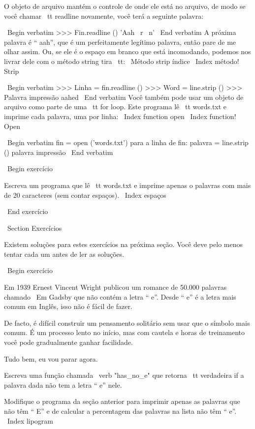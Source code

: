 \documentclass[10pt]{book}
\begin{document}
\begin {itemize}
{{{{{{O objeto de arquivo mantém o controle de onde ele está no arquivo, de modo
se você chamar {\ tt readline} novamente, você terá a seguinte palavra:

\ Begin {verbatim}
>>> Fin.readline ()
'Aah \ r \ n'
\ End {verbatim}
%
A próxima palavra é `` aah'', que é um perfeitamente legítimo
palavra, então pare de me olhar assim.
Ou, se ele é o espaço em branco que está incomodando,
podemos nos livrar dele com o método string {tira \ tt}:
\ {Método strip} índice
\ Index {método! Strip}

\ Begin {verbatim}
>>> Linha = fin.readline ()
>>> Word = line.strip ()
>>> Palavra impressão
aahed
\ End {verbatim}
%
Você também pode usar um objeto de arquivo como parte de uma {\ tt for} loop.
Este programa lê {\ tt words.txt} e imprime cada palavra, uma
por linha:
\ Index {function open}
\ Index {function! Open}

\ Begin {verbatim}
fin = open ('words.txt')
para a linha de fin:
    palavra = line.strip ()
    palavra impressão
\ End {verbatim}
%

\ Begin {} exercício

Escreva um programa que lê {\ tt words.txt} e imprime apenas o
palavras com mais de 20 caracteres (sem contar espaços).
\ Index {espaços}

\ End {} exercício


\ Section {Exercícios}

Existem soluções para estes exercícios na próxima seção.
Você deve pelo menos tentar cada um antes de ler as soluções.

\ Begin {} exercício

Em 1939 Ernest Vincent Wright publicou um romance de 50.000 palavras chamado
{\ Em Gadsby} que não contém a letra `` e''. Desde `` e'' é
a letra mais comum em Inglês, isso não é fácil de fazer.

De facto, é difícil construir um pensamento solitário sem usar
que o símbolo mais comum. É um processo lento no início, mas com cautela
e horas de treinamento você pode gradualmente ganhar facilidade.

Tudo bem, eu vou parar agora.

Escreva uma função chamada \ verb "has_no_e" que retorna {\ tt verdadeira} if
a palavra dada não tem a letra `` e'' nele.

Modifique o programa da seção anterior para imprimir apenas as palavras
que não têm `` E'' e de calcular a percentagem das palavras na lista
não têm `` e''.
\ Index {} lipogram

}}}}}}
\end{itemize}
\end{document}
